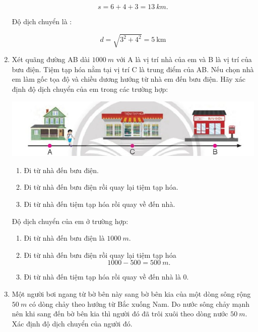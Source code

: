 \begin{enumerate}[label=\bfseries Bài \arabic*:]
{		$$s=6+4+3=\SI{13}{km}.$$
		
		Độ dịch chuyển là :
		
		$$d=\sqrt{3^2+4^2}=\SI{5}{\kilo\meter}$$
	}
	
	
	\item {}
	
	
	{
		Xét quãng đường AB dài $\SI{1000}{m}$ với A là vị trí nhà của em và B là vị trí của bưu điện. Tiệm tạp hóa nằm tại vị trí C là trung điểm của AB. Nếu chọn nhà em làm gốc tọa độ và chiều dương hướng từ nhà em đến bưu điện. Hãy xác định độ dịch chuyển của em trong các trường hợp:
		\begin{center}
			\includegraphics[scale=0.6]{../figs/VN10-2022-PH-TP004-7.jpg}
		\end{center}
		\begin{enumerate}[label=\alph*)]
			\item Đi từ nhà đến bưu điện.
			\item Đi từ nhà đến bưu điện rồi quay lại tiệm tạp hóa.
			\item Đi từ nhà đến tiệm tạp hóa rồi quay về đến nhà.
		\end{enumerate}
		
	}
	
	\hideall
	{	
		Độ dịch chuyển của em ở trường hợp:
		\begin{enumerate}[label=\alph*)]
			\item Đi từ nhà đến bưu điện là $\SI{1000}{m}.$
			\item Đi từ nhà đến bưu điện rồi quay lại tiệm tạp hóa $$1000 - 500 = \SI{500}{m}.$$
			\item Đi từ nhà đến tiệm tạp hóa rồi quay về đến nhà là 0.
		\end{enumerate}
		
	}
\item {}


{
	Một người bơi ngang từ bờ bên này sang bờ bên kia của một dòng sông rộng $\SI{50}{m}$ có dòng chảy theo hướng từ Bắc xuống Nam. Do nước sông chảy mạnh nên khi sang đến bờ bên kia thì người đó đã trôi xuôi theo dòng nước $\SI{50}{m}$. Xác định độ dịch chuyển của người đó.
}


\end{enumerate}

